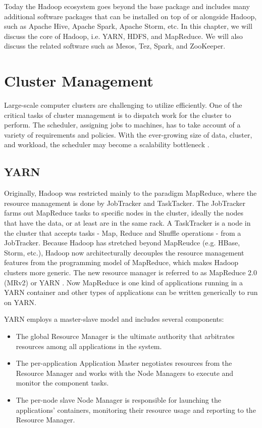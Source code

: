 \documentclass[11pt]{book}
\begin{document}
Today the Hadoop ecosystem goes beyond the base package and includes many additional software packages that can be installed on top of or alongside Hadoop, such as Apache Hive, Apache Spark, Apache Storm, etc. In this chapter, we will discuss the core of Hadoop, i.e. YARN, HDFS, and MapReduce. We will also discuss the related software such as Mesos, Tez, Spark, and ZooKeeper.

\section{Cluster Management}
Large-scale computer clusters are challenging to utilize efficiently. One of the critical tasks of cluster management is to dispatch work for the cluster to perform. The scheduler, assigning jobs to machines, has to take account of a variety of requirements and policies. With the ever-growing size of data, cluster, and workload, the scheduler may become a scalability bottleneck \cite{Schwarzkopf:2013:OFS}.

\subsection[YARN]
{YARN}
 Originally, Hadoop was restricted mainly to the paradigm MapReduce, where the resource management is done by JobTracker and TaskTacker.
The JobTracker farms out MapReduce tasks to specific nodes in the cluster, ideally the nodes that have the data, or at least are in the same rack. A TaskTracker is a node in the cluster that accepts tasks - Map, Reduce and Shuffle operations - from a JobTracker. Because Hadoop has stretched beyond MapReudce (e.g. HBase, Storm, etc.), Hadoop now architecturally decouples the resource management features from the programming model of MapReduce, which makes Hadoop clusters more generic. The new resource manager is referred to as MapReduce 2.0 (MRv2) or YARN \cite{YARN2011:279}. Now MapReduce is one kind of applications running in a YARN container and other types of applications can be written generically to run on YARN.

YARN employs a master-slave model and includes several components:
\begin{itemize}
\item The global Resource Manager is the ultimate authority that arbitrates resources among all applications in the system.
\item The per-application Application Master negotiates resources from the Resource Manager and works with the Node Managers to execute and monitor the component tasks.
\item The per-node slave Node Manager is responsible for launching the applications' containers, monitoring their resource usage and reporting to the Resource Manager.
\end{itemize}
\end{document}
